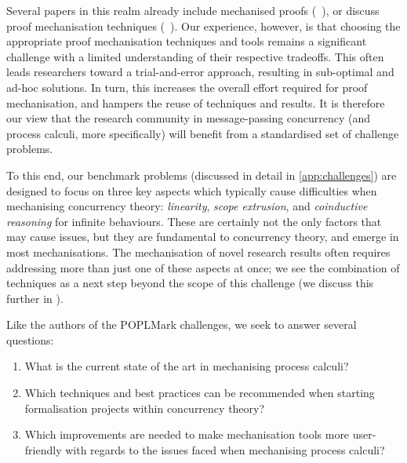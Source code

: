 \documentclass[runningheads]{llncs}
\begin{document}
Several papers in this realm already include mechanised proofs
(\eg~\cite{Castro-Perez2021,Castro2020,lmcs:9985,
  DBLP:journals/jar/CruzFilipeMP23, Tirore:2023}), or discuss proof mechanisation techniques
(\eg~\cite{Bengtson2016, Gay2001,
  Thiemann2019, DBLP:conf/forte/ZalakainD21}).  Our
experience, however, is that choosing the appropriate proof mechanisation techniques and 
tools remains a significant challenge with a limited understanding of their 
respective tradeoffs.  This often leads researchers toward a trial-and-error approach, 
resulting in sub-optimal and ad-hoc solutions. In turn, this increases the overall effort 
required for proof mechanisation, and hampers the reuse of techniques and results.
%
It is therefore our view that the research community in message-passing
concurrency (and process calculi, more specifically) will benefit from a standardised set
of challenge problems.

To this end, our benchmark problems (discussed in detail in \cref{app:challenges}) are designed to focus on three key aspects which typically cause difficulties 
when mechanising concurrency theory: \emph{linearity}, \emph{scope extrusion}, 
and \emph{coinductive reasoning} for infinite behaviours. These are certainly not the only factors that may cause issues, but they
are fundamental to concurrency theory, and emerge in most mechanisations.
The mechanisation of novel research results often requires addressing more than
just one of these aspects at once; we see the combination of techniques
as a next step beyond the scope of this challenge (we discuss this further in
).

Like the authors of the POPLMark challenges, we seek to
answer several questions:
\begin{enumerate}[label=\textbf{(Q\arabic*)},leftmargin=10mm]
\item\label{item:rq1} What is the current state of the art in mechanising process calculi?
\item\label{item:rq2} Which techniques and best practices can be recommended when starting formalisation projects within concurrency theory?
\item\label{item:rq3} Which improvements are needed to make mechanisation tools more user-friendly with regards to the issues faced when mechanising process calculi?
\end{enumerate}
\end{document}

